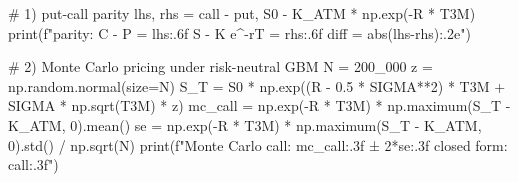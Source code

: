 \documentclass{pyportfolios-note}
\begin{document}
\begin{notecode}
# 1) put-call parity
lhs, rhs = call - put, S0 - K_ATM * np.exp(-R * T3M)
print(f"parity: C - P = {lhs:.6f}   S - K e^-rT = {rhs:.6f}   diff = {abs(lhs-rhs):.2e}")

# 2) Monte Carlo pricing under risk-neutral GBM
N = 200_000
z = np.random.normal(size=N)
S_T = S0 * np.exp((R - 0.5 * SIGMA**2) * T3M + SIGMA * np.sqrt(T3M) * z)
mc_call = np.exp(-R * T3M) * np.maximum(S_T - K_ATM, 0).mean()
se      = np.exp(-R * T3M) * np.maximum(S_T - K_ATM, 0).std() / np.sqrt(N)
print(f"Monte Carlo call: {mc_call:.3f} ± {2*se:.3f}   closed form: {call:.3f}")
\end{notecode}

\noteneedroom{330bp}
\end{document}
